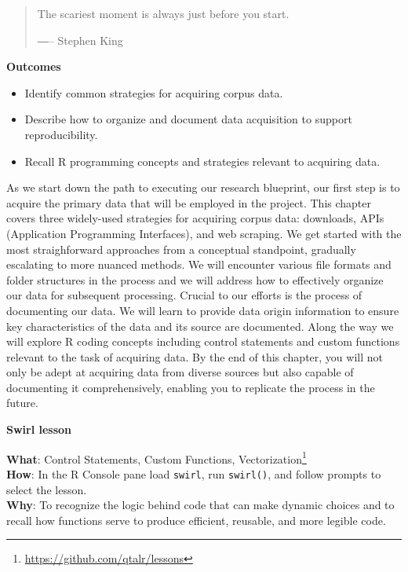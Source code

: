 \documentclass[
  letterpaper,
  DIV=11,
  numbers=noendperiod]{scrreport}
\providecommand{\tightlist}{%
  \setlength{\itemsep}{0pt}\setlength{\parskip}{0pt}}\usepackage{longtable,booktabs,array}
\theoremstyle{definition}
\theoremstyle{remark}
\DeclareRobustCommand{\href}[2]{#2\footnote{\url{#1}}}
\begin{document}
\begin{quote}
The scariest moment is always just before you start.

―-- Stephen King
\end{quote}

\begin{tcolorbox}[enhanced jigsaw, breakable, arc=.35mm, leftrule=.75mm, rightrule=.15mm, colback=white, toprule=.15mm, bottomrule=.15mm, opacityback=0, left=2mm]

\textbf{ Outcomes}

\begin{itemize}
\tightlist
\item
  Identify common strategies for acquiring corpus data.
\item
  Describe how to organize and document data acquisition to support
  reproducibility.
\item
  Recall R programming concepts and strategies relevant to acquiring
  data.
\end{itemize}

\end{tcolorbox}

As we start down the path to executing our research blueprint, our first
step is to acquire the primary data that will be employed in the
project. This chapter covers three widely-used strategies for acquiring
corpus data: downloads, APIs (Application Programming Interfaces), and
web scraping. We get started with the most straighforward approaches
from a conceptual standpoint, gradually escalating to more nuanced
methods. We will encounter various file formats and folder structures in
the process and we will address how to effectively organize our data for
subsequent processing. Crucial to our efforts is the process of
documenting our data. We will learn to provide data origin information
to ensure key characteristics of the data and its source are documented.
Along the way we will explore R coding concepts including control
statements and custom functions relevant to the task of acquiring data.
By the end of this chapter, you will not only be adept at acquiring data
from diverse sources but also capable of documenting it comprehensively,
enabling you to replicate the process in the future.

\begin{tcolorbox}[enhanced jigsaw, breakable, arc=.35mm, leftrule=.75mm, rightrule=.15mm, colback=white, toprule=.15mm, bottomrule=.15mm, opacityback=0, left=2mm]

\textbf{ Swirl lesson}

\textbf{What}: \href{https://github.com/qtalr/lessons}{Control
Statements, Custom Functions, Vectorization}\\
\textbf{How}: In the R Console pane load \texttt{swirl}, run
\texttt{swirl()}, and follow prompts to select the lesson.\\
\textbf{Why}: To recognize the logic behind code that can make dynamic
choices and to recall how functions serve to produce efficient,
reusable, and more legible code.

\end{tcolorbox}
\end{document}
